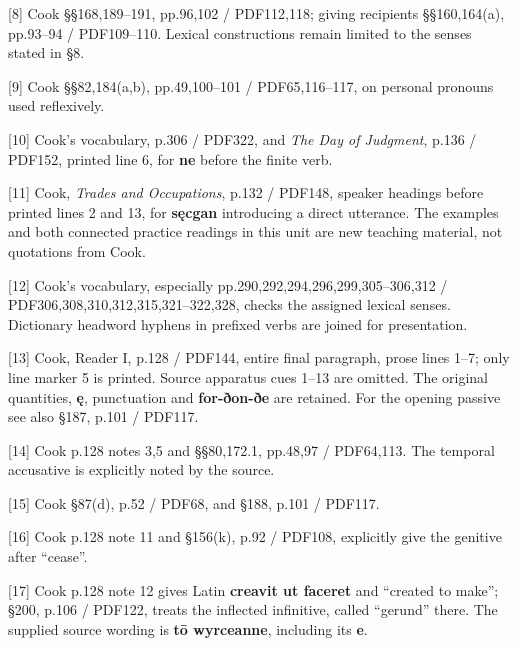 [8] Cook §§168,189–191, pp.96,102 /\allowbreak{} PDF112,118; giving recipients §§160,164(a), pp.93–94 /\allowbreak{} PDF109–110. Lexical constructions remain limited to the senses stated in §8.

[9] Cook §§82,184(a,b), pp.49,100–101 /\allowbreak{} PDF65,116–117, on personal pronouns used reflexively.

[10] Cook’s vocabulary, p.306 /\allowbreak{} PDF322, and \emph{The Day of Judgment}, p.136 /\allowbreak{} PDF152, printed line 6, for \textbf{ne} before the finite verb.

[11] Cook, \emph{Trades and Occupations}, p.132 /\allowbreak{} PDF148, speaker headings before printed lines 2 and 13, for \textbf{sęcgan} introducing a direct utterance. The examples and both connected practice readings in this unit are new teaching material, not quotations from Cook.

[12] Cook’s vocabulary, especially pp.290,292,294,296,299,305–306,312 /\allowbreak{} PDF306,308,310,312,315,321–322,328, checks the assigned lexical senses. Dictionary headword hyphens in prefixed verbs are joined for presentation.

[13] Cook, Reader I, p.128 /\allowbreak{} PDF144, entire final paragraph, prose lines 1–7; only line marker 5 is printed. Source apparatus cues 1–13 are omitted. The original quantities, \textbf{ę}, punctuation and \textbf{for-ðon-ðe} are retained. For the opening passive see also §187, p.101 /\allowbreak{} PDF117.

[14] Cook p.128 notes 3,5 and §§80,172.1, pp.48,97 /\allowbreak{} PDF64,113. The temporal accusative is explicitly noted by the source.

[15] Cook §87(d), p.52 /\allowbreak{} PDF68, and §188, p.101 /\allowbreak{} PDF117.

[16] Cook p.128 note 11 and §156(k), p.92 /\allowbreak{} PDF108, explicitly give the genitive after “cease”.

[17] Cook p.128 note 12 gives Latin \textbf{creavit ut faceret} and “created to make”; §200, p.106 /\allowbreak{} PDF122, treats the inflected infinitive, called “gerund” there. The supplied source wording is \textbf{tō wyrceanne}, including its \textbf{e}.

\endgroup

\par\label{end-ch02-learner}
\clearpage\endgroup
